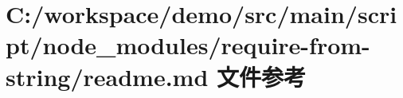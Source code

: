 \hypertarget{node__modules_2require-from-string_2_r_e_a_d_m_e_8md}{}\section{C\+:/workspace/demo/src/main/script/node\+\_\+modules/require-\/from-\/string/readme.md 文件参考}
\label{node__modules_2require-from-string_2_r_e_a_d_m_e_8md}
